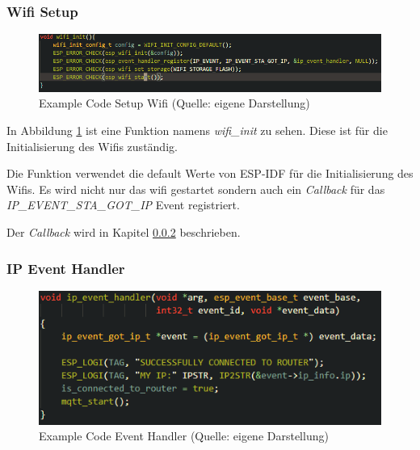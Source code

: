 \subsubsection{Wifi Setup}

\begin{figure}[H]
    \begin{center}
        \includegraphics[scale=0.]{images/example_code_setup_wifi.png}
        \caption{Example Code Setup Wifi (Quelle: eigene Darstellung)}
        \label{abb:example_code_setup_wifi}
    \end{center}
\end{figure}

In Abbildung \ref{abb:example_code_setup_wifi} ist eine Funktion namens \textit{wifi\_init} zu sehen. Diese ist für die Initialisierung des Wifis zuständig.

Die Funktion verwendet die default Werte von ESP-IDF für die Initialisierung des Wifis.
Es wird nicht nur das wifi gestartet sondern auch ein \textit{Callback} für das \textit{IP\_EVENT\_STA\_GOT\_IP} Event registriert.

Der \textit{Callback} wird in Kapitel \ref{sec:example-code-event-handler} beschrieben.

\subsubsection{IP Event Handler}\label{sec:example-code-event-handler}

\begin{figure}[H]
    \begin{center}
        \includegraphics[scale=0.8]{images/example_code_event_handler.png}
        \caption{Example Code Event Handler (Quelle: eigene Darstellung)}
        \label{abb:example_code_event_handler}
    \end{center}
\end{figure}

